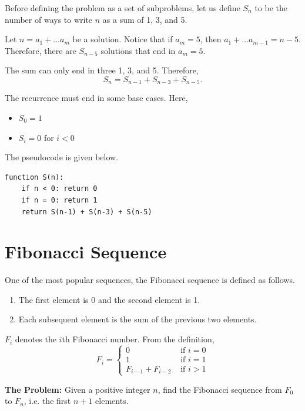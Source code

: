 \documentclass[12pt, a4paper]{article}
\theoremstyle{definition}
\theoremstyle{remark}
\begin{document}
Before defining the problem as a set of subproblems, let us define $S_n$ to be the number of ways to write $n$ as a sum of 1, 3, and 5.

Let $n = a_1 + \ldots a_m$ be a solution. Notice that if $a_m = 5$, then $a_1 + \ldots a_{m-1} = n - 5$. Therefore, there are $S_{n-5}$ solutions that end in $a_m = 5$.

The sum can only end in three 1, 3, and 5. Therefore,
\begin{equation}
    S_n = S_{n-1} + S_{n-3} + S_{n-5}.
\end{equation}

The recurrence must end in some base cases. Here,
\begin{itemize}
    \item $S_0 = 1$
    \item $S_i = 0$ for $i < 0$
\end{itemize}

The pseudocode is given below.
\begin{lstlisting}
function S(n):
    if n < 0: return 0
    if n = 0: return 1
    return S(n-1) + S(n-3) + S(n-5)
\end{lstlisting}

\section{Fibonacci Sequence}
One of the most popular sequences, the Fibonacci sequence is defined as follows.
\begin{enumerate}
    \item The first element is 0 and the second element is 1.
    \item Each subsequent element is the sum of the previous two elements.
\end{enumerate}

$F_i$ denotes the $i$th Fibonacci number. From the definition,
\begin{equation}
    F_i = \begin{cases}
        0                 & \text{ if } i = 0 \\
        1                 & \text{ if } i = 1 \\
        F_{i-1} + F_{i-2} & \text{ if } i > 1
    \end{cases}
\end{equation}

\begin{tcolorbox}
    \textbf{The Problem:} Given a positive integer $n$, find the Fibonacci sequence from $F_0$ to $F_n$, i.e. the first $n+1$ elements.
\end{tcolorbox}
\end{document}
